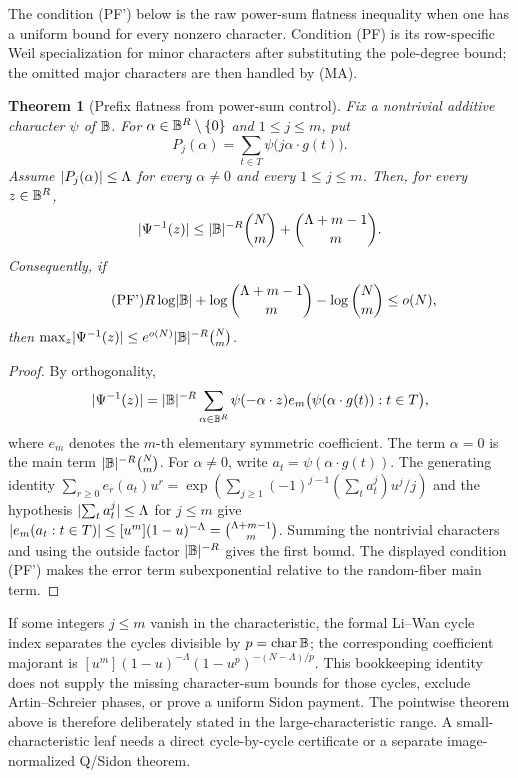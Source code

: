 \documentclass[11pt,a4paper]{amsart}
\numberwithin{equation}{section}
\newtheorem{theorem}{Theorem}[section]
\theoremstyle{remark}
\begin{document}
The condition \textup{(PF')} below is the raw power-sum flatness
inequality when one has a uniform bound for every nonzero character.
Condition \textup{(PF)} is its row-specific Weil specialization for minor
characters after substituting the pole-degree bound; the omitted major
characters are then handled by \textup{(MA)}.

\begin{theorem}[Prefix flatness from power-sum control]\label{thm:prefix-flatness-power-sum}
Fix a nontrivial additive character \(\psi\) of \(\mathbb B\).  For \(\alpha\in\mathbb B^R\setminus\{0\}\) and \(1\le j\le m\), put
\[
        P_j(\alpha)=\sum_{t\in T}\psi\bigl(j\alpha\cdot g(t)\bigr).
\]
Assume \(\lvert P_j(\alpha)\rvert\le \Lambda\) for every \(\alpha\ne0\) and every \(1\le j\le m\).  Then, for every \(z\in\mathbb B^R\),
\[
        \lvert \Psi^{-1}(z)\rvert
        \le \lvert \mathbb B\rvert^{-R}\binom Nm+\binom{\Lambda+m-1}{m}.
\]
Consequently, if
\[
        \tag{PF'}
        R\log\lvert \mathbb B\rvert+\log\binom{\Lambda+m-1}{m}-\log\binom Nm\le o(N),
\]
then \(\max_z\lvert \Psi^{-1}(z)\rvert\le e^{o(N)}\lvert \mathbb B\rvert^{-R}\binom Nm\).
\end{theorem}

\begin{proof}
By orthogonality,
\[
        \lvert \Psi^{-1}(z)\rvert=\lvert \mathbb B\rvert^{-R}
        \sum_{\alpha\in\mathbb B^R}\psi(-\alpha\cdot z)
        e_m\bigl(\psi(\alpha\cdot g(t)):t\in T\bigr),
\]
where \(e_m\) denotes the \(m\)-th elementary symmetric coefficient.  The term \(\alpha=0\) is the main term \(\lvert \mathbb B\rvert^{-R}\binom Nm\).  For \(\alpha\ne0\), write \(a_t=\psi(\alpha\cdot g(t))\).  The generating identity
\(\sum_{r\ge0}e_r(a_t)u^r=\exp(\sum_{j\ge1}(-1)^{j-1}(\sum_ta_t^j)u^j/j)\) and the hypothesis \(\lvert \sum_ta_t^j\rvert\le\Lambda\) for \(j\le m\) give
\(\lvert e_m(a_t:t\in T)\rvert\le[u^m](1-u)^{-\Lambda}=\binom{\Lambda+m-1}{m}\).  Summing the nontrivial characters and using the outside factor \(\lvert \mathbb B\rvert^{-R}\) gives the first bound.  The displayed condition \textup{(PF')} makes the error term subexponential relative to the random-fiber main term.
\end{proof}

\begin{remark}\label{rem:small-characteristic-cycles}
If some integers \(j\le m\) vanish in the characteristic, the formal
Li--Wan cycle index \cite{LiWanSieve} separates the cycles divisible by
\(p=\operatorname{char}\mathbb B\); the corresponding coefficient majorant is
\([u^m](1-u)^{-\Lambda}(1-u^p)^{-(N-\Lambda)/p}\).  This bookkeeping
identity does not supply the missing character-sum bounds for those
cycles, exclude Artin--Schreier phases, or prove a uniform Sidon payment.
The pointwise theorem above is therefore deliberately stated in the
large-characteristic range.  A small-characteristic leaf needs a direct
cycle-by-cycle certificate or a separate image-normalized Q/Sidon theorem.
\end{remark}
\end{document}
